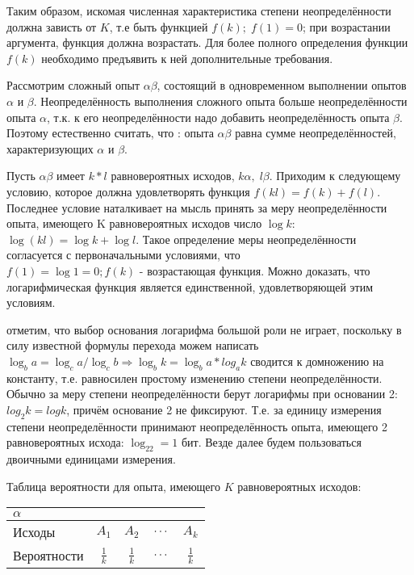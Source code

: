 \documentclass[a4paper,twoside,12pt]{report}
\begin{document}
	Таким образом, искомая численная характеристика степени неопределённости должна зависть от $K$, т.е быть функцией $f(k); \; f(1)=0$; при возрастании аргумента, функция должна возрастать. Для более полного определения функции $f(k)$ необходимо предъявить к ней дополнительные требования. 
	
	Рассмотрим сложный опыт $\alpha\beta$, состоящий в одновременном выполнении опытов $\alpha$ и $\beta$. Неопределённость выполнения сложного опыта больше неопределённости опыта $\alpha$, т.к. к его неопределённости надо добавить неопределённость опыта $\beta$. Поэтому естественно считать, что :  опыта $\alpha\beta$ равна сумме неопределённостей, характеризующих $\alpha$ и $\beta$.
	
	Пусть $\alpha \beta$ имеет $k*l$ равновероятных исходов, $k\alpha, \; l\beta$. Приходим к следующему условию, которое должна удовлетворять функция $f(kl) = f(k) + f(l)$. Последнее условие наталкивает на мысль принять за меру неопределённости опыта, имеющего K равновероятных исходов число $\log k$: $\log(kl) = \log k + \log l$. Такое определение меры неопределённости согласуется с первоначальными условиями, что $f(1) = \log1 = 0; f(k) \mbox{ - возрастающая функция}$. Можно доказать, что логарифмическая функция является единственной, удовлетворяющей этим условиям.


 	 отметим, что выбор основания логарифма большой роли не играет, поскольку в силу известной формулы перехода можем написать $\log_ba = \log_ca/\log_cb \Rightarrow \log_bk = \log_ba*log_ak$ сводится к домножению на константу, т.е. равносилен простому изменению  степени неопределённости. Обычно за меру степени неопределённости берут логарифмы при основании 2: $log_2k = logk$, причём основание 2 не фиксируют. Т.е. за единицу измерения степени неопределённости принимают неопределённость опыта, имеющего 2 равновероятных исхода: $\log_22 = 1$ бит. Везде далее будем пользоваться двоичными единицами измерения. 

	Таблица вероятности для опыта, имеющего $K$ равновероятных исходов:
	

	\begin{tabular}{|l|c|c|c|c|}
	\hline
		$\alpha$ &&&&\\
	\hline
		Исходы & $A_1$ & $A_2$ & $\,\ldots\,$ & $A_k$ \\
	\hline
		Вероятности& $\frac{1}{k}$& $\frac{1}{k}$ & $\,\ldots\,$ & $\frac{1}{k}$\\
	\hline
	\end{tabular}
\end{document}
